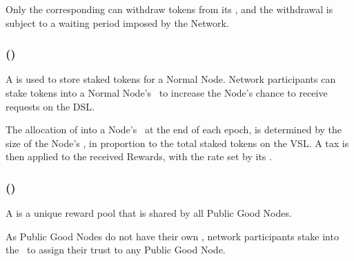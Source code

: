 Only the corresponding  can withdraw tokens from its \operationPool, and the withdrawal is subject to a waiting period imposed by the Network.

\subsubsection{ (\stakingPool)}
\label{subsubsec:staking_pool}

A  is used to store staked tokens for a Normal Node. Network participants can stake tokens into a Normal Node's \stakingPool\ to increase the Node's chance to receive requests on the \gls{DSL}.

The allocation of  into a Node's \stakingPool\ at the end of each epoch, is determined by the size of the Node's \stakingPool, in proportion to the total staked tokens on the \gls{VSL}.
A tax is then applied to the received Rewards, with the rate set by its .

\subsubsection{ (\publicGoodPool)}

A  is a unique reward pool that is shared by all Public Good Nodes.

As Public Good Nodes do not have their own \stakingPool, network participants stake into the \publicGoodPool\ to assign their trust to any Public Good Node.
